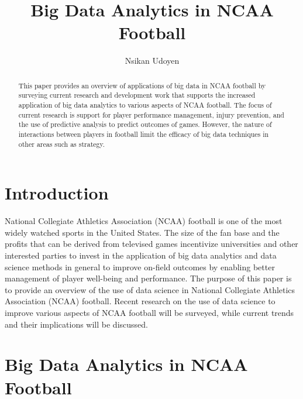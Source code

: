 \documentclass[sigconf]{acmart}
\begin{document}
\title{Big Data Analytics in NCAA Football}


\author{Nsikan Udoyen}

\renewcommand{\shortauthors}{N. Udoyen et al.}


\begin{abstract}
This paper provides an overview of applications of big data in NCAA football by surveying current research and development work that supports the increased application of big data analytics to various aspects of NCAA football. The focus of current research is support for player performance management, injury prevention, and the use of predictive analysis to predict outcomes of games. However, the nature of interactions between players in football limit the efficacy of big data techniques in other areas such as strategy.
\end{abstract}



\maketitle

\section{Introduction}

National Collegiate Athletics Association (NCAA) football is one of the most widely watched sports in the United States. 
The size of the fan base and the profits that can be derived from televised games incentivize universities and other interested parties 
to invest in the application of big data analytics and data science methods in general to improve on-field outcomes by enabling better 
management of player well-being and performance. The purpose of this paper is to provide an overview of the use of data science in 
National Collegiate Athletics Association (NCAA) football. Recent research on the use of data science to improve various aspects of NCAA 
football will be surveyed, while current trends and their implications will be discussed. 

\section{Big Data Analytics in NCAA Football}
\end{document}
